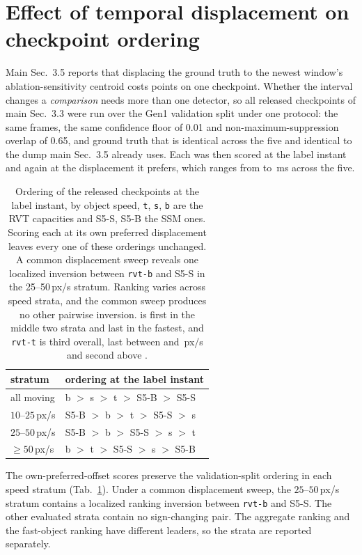 \documentclass[10pt,twocolumn,letterpaper]{article}
\begin{document}
\section{Effect of temporal displacement on checkpoint ordering}

Main Sec.~3.5 reports that displacing the ground truth to the newest window's ablation-sensitivity centroid costs
\mapCost{} points on one checkpoint. Whether the interval changes a \emph{comparison} needs
more than one detector, so all \rankCkpts{} released checkpoints of main Sec.~3.3 were run
over the Gen1 validation split under one protocol: the same frames, the same confidence
floor of 0.01 and non-maximum-suppression overlap of 0.65, and ground truth that is identical
across the five and identical to the dump main Sec.~3.5 already uses. Each was then scored at the label instant
and again at the displacement it prefers, which ranges from \rankArgLo{} to \rankArgHi\,ms
across the five.

\begin{table}[h]
\centering\footnotesize
\setlength{\tabcolsep}{3.4pt}\renewcommand{\arraystretch}{0.95}
\begin{tabular}{ll}
\toprule
stratum & ordering at the label instant \\
\midrule
all moving       & b $>$ s $>$ t $>$ S5-B $>$ S5-S \\
$10$--$25$\,px/s & S5-B $>$ b $>$ t $>$ S5-S $>$ s \\
$25$--$50$\,px/s & S5-B $>$ b $>$ S5-S $>$ s $>$ t \\
$\geq 50$\,px/s      & b $>$ t $>$ S5-S $>$ s $>$ S5-B \\
\bottomrule
\end{tabular}
\caption{Ordering of the \rankCkpts{} released checkpoints at the label instant, by object
speed, \texttt{t}, \texttt{s}, \texttt{b} are the RVT capacities and S5-S, S5-B the SSM ones. Scoring each at its own preferred displacement leaves every one of these
orderings unchanged. A common displacement sweep reveals one localized inversion
between \texttt{rvt-b} and S5-S in the 25--50\,px/s stratum. Ranking varies across
speed strata, and the common sweep produces no other pairwise inversion. \rankMover{}
is first in the middle two strata and last in the fastest, and \texttt{rvt-t} is third
overall, last between \mapCutMid{} and \mapCutHi\,px/s and second above \mapCutHi{}.}
\label{tab:ordering}
\end{table}

The own-preferred-offset scores preserve the validation-split ordering in each speed
stratum (Tab.~\ref{tab:ordering}). Under a common displacement sweep, the $25$--$50$\,px/s stratum
contains a localized ranking inversion between \texttt{rvt-b} and S5-S. The
other evaluated strata contain no sign-changing pair. The aggregate ranking and
the fast-object ranking have different leaders, so the strata are reported
separately.
\end{document}
